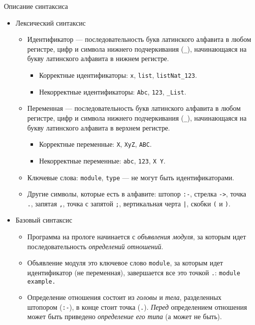 \documentclass[12pt]{article}
\begin{document}
\begin{center}
  {\Large Описание синтаксиса}
\end{center}
\begin{itemize}
  \item Лексический синтаксис
  \begin{itemize}
    \item Идентификатор --- последовательность букв латинского алфавита в любом регистре, цифр и символа нижнего подчеркивания (\verb!_!), начинающаяся на букву латинского алфавита в нижнем регистре.
    \begin{itemize}
      \item Корректные идентификаторы: \verb!x!, \verb!list!, \verb!listNat_123!.
      \item Некорректные идентификаторы: \verb!Abc!, \verb!123!, \verb!_List!.
    \end{itemize}
    \item Переменная --- последовательность букв латинского алфавита в любом регистре, цифр и символа нижнего подчеркивания (\verb!_!), начинающаяся на букву латинского алфавита в верхнем регистре.
    \begin{itemize}
      \item Корректные переменные: \verb!X!, \verb!XyZ!, \verb!ABC!.
      \item Некорректные переменные: \verb!abc!, \verb!123!, \verb!X Y!.
    \end{itemize}
    \item Ключевые слова: \verb!module!, \verb!type! --- не могут быть идентификаторами.
    \item Другие символы, которые есть в алфавите: штопор \verb!:-!, стрелка \verb!->!, точка \verb!.!, запятая \verb!,!, точка с запятой \verb!;!, вертикальная черта \verb!|!, скобки \verb!(! и \verb!)!.
  \end{itemize}
  \item Базовый синтаксис
      \begin{itemize}
        \item Программа на прологе начинается с \emph{объявления модуля}, за которым идет последовательность \emph{определений отношений}.
        \item Объявление модуля это ключевое слово \verb!module!, за которым идет идентификатор (не переменная), завершается все это точкой \verb!.!: \verb!module example.!
        \item Определение отношения состоит из \emph{головы} и \emph{тела}, разделенных штопором (\verb!:-!), в конце стоит точка (\verb!.!). \emph{Перед} определением отношения может быть приведено \emph{определение его типа} (а может не быть).

\end{itemize}
\end{itemize}
\end{document}
